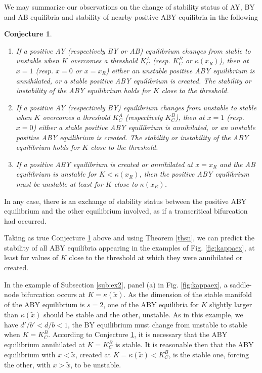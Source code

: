 \documentclass[12pt]{article}
\newtheorem{conjecture}[theorem]{Conjecture}
\theoremstyle{definition}
\begin{document}
We may summarize our observations on the change of stability status of AY, BY and AB equilibria and stability of nearby positive ABY equilibria in the following
\begin{conjecture} \label{conjtc}
	
	\begin{enumerate}
		Suppose generic positive values for all parameters in the BW model and also that $\kappa$ does not have a critical point at $x=1$, $x=0$, or $x=x_R$.
		\item If a positive AY (respectively BY or AB) equilibrium changes from stable to unstable when $K$ overcomes a threshold $K^A_C$ (resp. $K^B_C$ or $\kappa(x_R)$), then at $x=1$ (resp. $x=0$ or $x=x_R$) either an unstable positive ABY equilibrium is annihilated, or a stable positive ABY equilibrium is created. The stability or instability of the ABY equilibrium holds for $K$ close to the threshold.
		\item If a positive AY (respectively BY) equilibrium changes from unstable to stable when $K$ overcomes a threshold $K^A_C$ (respectively $K^B_C$), then at $x=1$ (resp. $x=0$) either a stable positive ABY equilibrium is annihilated, or an unstable positive ABY equilibrium is created. The stability or instability of the ABY equilibrium holds for $K$ close to the threshold.
		\item If a positive ABY equilibrium is created or annihilated at $x=x_R$ and the AB equilibrium is unstable for $K<\kappa(x_R)$, then the positive ABY equilibrium must be unstable at least for $K$ close to $\kappa(x_R)$. 
	\end{enumerate}
\end{conjecture}

In any case, there is an exchange of stability status between the positive ABY equilibrium and the other equilibrium involved, as if a transcritical bifurcation had occurred.

Taking as true Conjecture \ref{conjtc} above and using Theorem \ref{thsn}, we can predict the stability of all ABY equilibria appearing in the examples of Fig. \ref{fig:kappaex}, at least for values of $K$ close to the threshold at which they were annihilated or created.

In the example of Subsection \ref{sub:ex2}, panel (a) in Fig. \ref{fig:kappaex}, a saddle-node bifurcation occurs at $K=\kappa(\tilde{x})$. As the dimension of the stable manifold of the ABY equilibrium is $s=2$, one of the ABY equilibria for $K$ slightly larger than $\kappa(\tilde{x})$ should be stable and the other, unstable. As in this example, we have $d'/b'<d/b<1$, the BY equilibrium must change from unstable to stable when $K=K^B_C$. According to Conjecture \ref{conjtc}, it is necessary that the ABY equilibrium annihilated at $K=K^B_C$ is stable. It is reasonable then that the ABY equilibrium with $x<\tilde{x}$, created at $K=\kappa(\tilde{x})<K^B_C$, is the stable one, forcing the other, with $x>\tilde{x}$, to be unstable. 
\end{document}
